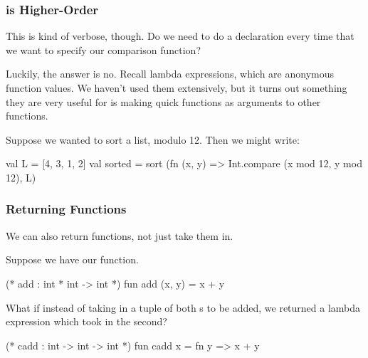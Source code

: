 \documentclass[aspectratio=169]{beamer}
\begin{document}
\begin{frame}[fragile]
  \frametitle{ is Higher-Order}

  This is kind of verbose, though. Do we need to do a  declaration every
  time that we want to specify our comparison function?

  \pause
  \vspace{\fill}

  Luckily, the answer is no. Recall lambda expressions, which are anonymous function
  values. We haven't used them extensively, but it turns out something they are very
  useful for is making quick functions as arguments to other functions.

  \pause
  \vspace{\fill}

  Suppose we wanted to sort a list, modulo 12. Then we might write:

  \pause
  \begin{codeblock}
    val L = [4, 3, 1, 2]
    val sorted =
      sort (fn (x, y) => Int.compare (x mod 12,  y mod 12), L)
  \end{codeblock}
\end{frame}

\begin{frame}[fragile]
  \frametitle{Returning Functions}

  We can also return functions, not just take them in.

  \pause
  \vspace{\fill}


  \pause
  Suppose we have our  function.

  \begin{codeblock}
    (* add : int * int -> int *)
    fun add (x, y) = x + y
  \end{codeblock}

  \pause
  \vspace{\fill}

  What if instead of taking in a tuple of both s to be added,
  we returned a lambda expression which took in the second?

  \pause
  \begin{codeblock}
    (* cadd : int -> int -> int *)
    fun cadd x = fn y => x + y
  \end{codeblock}

  \pause
  \vspace{\fill}

\end{frame}
\end{document}
